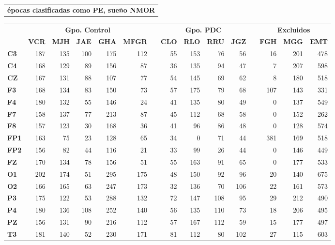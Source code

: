 \begin{SidewaysTable}
\centering
\begin{tabular}{c}
\textbf{\'epocas clasificadas como PE, sue\~no NMOR}
\vspace{1em}
\end{tabular}
\begin{tabular}{lrrrrrcrrrrcrrr}
\toprule
& \multicolumn{5}{c}{\textbf{Gpo. Control}} && 
  \multicolumn{4}{c}{\textbf{Gpo. PDC}} && 
  \multicolumn{3}{c}{\textbf{Excluidos}}\\
\cmidrule{2-6} \cmidrule{8-11} \cmidrule{13-15}
& \textbf{VCR} & \textbf{MJH} & \textbf{JAE} & \textbf{GHA} & \textbf{MFGR} & \phantom{l}
& \textbf{CLO} & \textbf{RLO} & \textbf{RRU} & \textbf{JGZ} & \phantom{l}
& \textbf{FGH} & \textbf{MGG} & \textbf{EMT} \\
\midrule
\textbf{C3} &187&135&100&175&112&&55 &153&76 &56 &&16 &201&478 \\
\textbf{C4} &168&129&89 &156&87 &&36 &135&94 &47 &&7  &207&598 \\
\textbf{CZ} &167&131&88 &107&77 &&54 &145&69 &62 &&8  &180&518 \\
\rowcolor{gris}
\textbf{F3} &168&134&83 &150&73 &&57 &175&79 &68 &&107&143&331 \\
\rowcolor{gris}
\textbf{F4} &180&132&55 &146&24 &&41 &135&80 &49 &&0  &137&549 \\
\rowcolor{gris}
\textbf{F7} &158&137&77 &213&87 &&45 &112&68 &58 &&0  &152&262 \\
\rowcolor{gris}
\textbf{F8} &157&123&30 &168&36 &&41 &96 &86 &48 &&0  &128&574 \\
\textbf{FP1}&163&75 &23 &128&65 &&34 &0  &71 &44 &&381&169&518 \\
\textbf{FP2}&156&82 &44 &116&21 &&33 &99 &26 &44 &&0  &146&449 \\
\textbf{FZ} &170&134&78 &156&51 &&55 &163&91 &65 &&0  &177&533 \\
\rowcolor{gris}
\textbf{O1} &202&174&51 &295&175&&48 &150&92 &96 &&20 &140&675 \\
\rowcolor{gris}
\textbf{O2} &166&165&63 &247&173&&32 &136&70 &106&&22 &161&573 \\
\textbf{P3} &175&122&53 &288&132&&72 &147&108&95 &&29 &212&490 \\
\textbf{P4} &180&136&108&252&140&&56 &135&110&73 &&18 &206&495 \\
\textbf{PZ} &156&131&90 &216&112&&57 &167&112&59 &&15 &177&497 \\
\rowcolor{gris}
\textbf{T3} &181&140&52 &230&171&&81 &112&80 &102&&27 &115&603 \\

\end{tabular}
\end{SidewaysTable}

